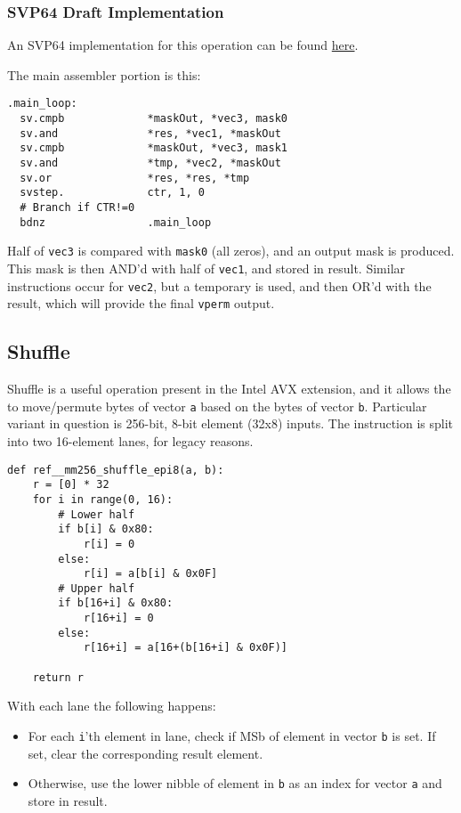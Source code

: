 \subsubsection{SVP64 Draft Implementation}

An SVP64 implementation for this operation can be found
\href{https://git.vantosh.com/ngisearch/glibc-svp64/src/branch/master/svp64-port/svp64/vperm_svp64.s}{here}.

The main assembler portion is this:
\begin{verbatim}
.main_loop:
  sv.cmpb             *maskOut, *vec3, mask0
  sv.and              *res, *vec1, *maskOut
  sv.cmpb             *maskOut, *vec3, mask1
  sv.and              *tmp, *vec2, *maskOut
  sv.or               *res, *res, *tmp
  svstep.             ctr, 1, 0
  # Branch if CTR!=0
  bdnz                .main_loop
\end{verbatim}

Half of \texttt{vec3} is compared with \texttt{mask0} (all zeros), and an output
mask is produced. This mask is then AND'd with half of \texttt{vec1}, and stored
in result.
Similar instructions occur for \texttt{vec2}, but a temporary is used, and then
OR'd with the result, which will provide the final \texttt{vperm} output.

\subsection{Shuffle}

Shuffle is a useful operation present in the Intel AVX extension, and it allows
the to move/permute bytes of vector \texttt{a} based on the bytes of vector
\texttt{b}.
Particular variant in question is 256-bit, 8-bit element (32x8) inputs.
The instruction is split into two 16-element lanes, for legacy reasons.

\begin{verbatim}
def ref__mm256_shuffle_epi8(a, b):
    r = [0] * 32
    for i in range(0, 16):
        # Lower half
        if b[i] & 0x80:
            r[i] = 0
        else:
            r[i] = a[b[i] & 0x0F]
        # Upper half
        if b[16+i] & 0x80:
            r[16+i] = 0
        else:
            r[16+i] = a[16+(b[16+i] & 0x0F)]

    return r
\end{verbatim}

With each lane the following happens:

\begin{itemize}
  \item For each \texttt{i}'th element in lane, check if \acrfull{MSb} of
        element in vector \texttt{b} is set. If set, clear the corresponding
        result element.
  \item Otherwise, use the lower nibble of element in \texttt{b} as an index
        for vector \texttt{a} and store in result.
\end{itemize}

